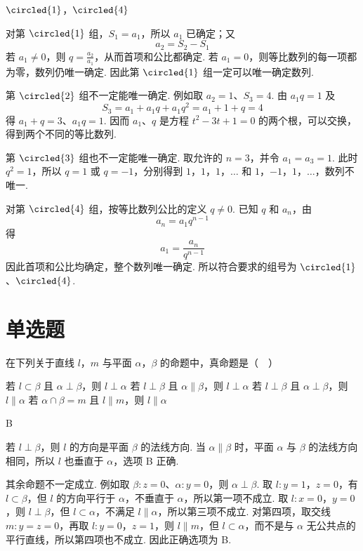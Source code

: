 \begin{answer}
\(\circled{1}\)，\(\circled{4}\)
\end{answer}

\begin{solution}
对第 \(\circled{1}\) 组，\(S_1=a_1\)，所以 \(a_1\) 已确定；又
\[
a_2=S_2-S_1
\]
若 \(a_1\ne0\)，则 \(q=\frac{a_2}{a_1}\)，从而首项和公比都确定. 若 \(a_1=0\)，则等比数列的每一项都为零，数列仍唯一确定. 因此第 \(\circled{1}\) 组一定可以唯一确定数列.

第 \(\circled{2}\) 组不一定能唯一确定. 例如取 \(a_2=1\)、\(S_3=4\). 由 \(a_1q=1\) 及
\[
S_3=a_1+a_1q+a_1q^2=a_1+1+q=4
\]
得 \(a_1+q=3\)、\(a_1q=1\). 因而 \(a_1\)、\(q\) 是方程 \(t^2-3t+1=0\) 的两个根，可以交换，得到两个不同的等比数列.

第 \(\circled{3}\) 组也不一定能唯一确定. 取允许的 \(n=3\)，并令 \(a_1=a_3=1\). 此时 \(q^2=1\)，所以 \(q=1\) 或 \(q=-1\)，分别得到 \(1\)，\(1\)，\(1\)，\(\ldots\) 和 \(1\)，\(-1\)，\(1\)，\(\ldots\)，数列不唯一.

对第 \(\circled{4}\) 组，按等比数列公比的定义 \(q\ne0\). 已知 \(q\) 和 \(a_n\)，由
\[
a_n=a_1q^{n-1}
\]
得
\[
a_1=\frac{a_n}{q^{n-1}}
\]
因此首项和公比均确定，整个数列唯一确定. 所以符合要求的组号为 \(\circled{1}\)、\(\circled{4}\).
\end{solution}

\section{单选题}
\begin{problem}
在下列关于直线 \(l\)，\(m\) 与平面 \(\alpha\)，\(\beta\) 的命题中，真命题是（\(\quad\)）

\choices
    {若 \(l \subset \beta\) 且 \(\alpha \perp \beta\)，则 \(l \perp \alpha\)}
    {若 \(l \perp \beta\) 且 \(\alpha \parallel \beta\)，则 \(l \perp \alpha\)}
    {若 \(l \perp \beta\) 且 \(\alpha \perp \beta\)，则 \(l \parallel \alpha\)}
    {若 \(\alpha \cap \beta = m\) 且 \(l \parallel m\)，则 \(l \parallel \alpha\)}
\end{problem}

\begin{answer}
B
\end{answer}

\begin{solution}
若 \(l\perp\beta\)，则 \(l\) 的方向是平面 \(\beta\) 的法线方向. 当 \(\alpha\parallel\beta\) 时，平面 \(\alpha\) 与 \(\beta\) 的法线方向相同，所以 \(l\) 也垂直于 \(\alpha\)，选项 B 正确.

其余命题不一定成立. 例如取 \(\beta:z=0\)、\(\alpha:y=0\)，则 \(\alpha\perp\beta\). 取 \(l:y=1\)，\(z=0\)，有 \(l\subset\beta\)，但 \(l\) 的方向平行于 \(\alpha\)，不垂直于 \(\alpha\)，所以第一项不成立. 取 \(l:x=0\)，\(y=0\)，则 \(l\perp\beta\)，但 \(l\subset\alpha\)，不满足 \(l\parallel\alpha\)，所以第三项不成立. 对第四项，取交线 \(m:y=z=0\)，再取 \(l:y=0\)，\(z=1\)，则 \(l\parallel m\)，但 \(l\subset\alpha\)，而不是与 \(\alpha\) 无公共点的平行直线，所以第四项也不成立. 因此正确选项为 B.
\end{solution}

